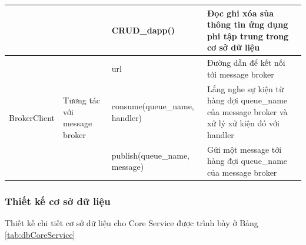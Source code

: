 \documentclass[../DoAn.tex]{subfiles}
\begin{document}
\begin{longtable}{|p{}|p{}|p{}|p{}|}
                                                   &                                                                                    & \hspace{0pt}CRUD\_dapp\hspace{0pt}()                                              & Đọc ghi xóa sủa thông tin ứng dụng phi tập trung trong cơ sở dữ liệu                         \\ \hline
    \multirow[t]{3}{0.175\textwidth}{BrokerClient} & \multirow[t]{3}{0.175\textwidth}{Tương tác với message broker}                     & \hspace{0pt}url                                                                   & Đường dẫn để kết nối tới message broker                                                      \\ \cline{3-4}
                                                   &                                                                                    & \hspace{0pt}consume\hspace{0pt}(queue\_name, handler)                             & Lắng nghe sự kiện từ hàng đợi queue\_name của message broker và xử lý xử kiện đó với handler \\ \cline{3-4}
                                                   &                                                                                    & \hspace{0pt}publish\hspace{0pt}(queue\_name, message)                             & Gửi một message tới hàng đợi queue\_name của message broker                                  \\ \hline
\end{longtable}

\subsubsection{Thiết kế cơ sở dữ liệu}

Thiết kế chi tiết cơ sở dữ liệu cho Core Service được trình bày ở Bảng
\ref{tab:dbCoreService}

\end{document}
